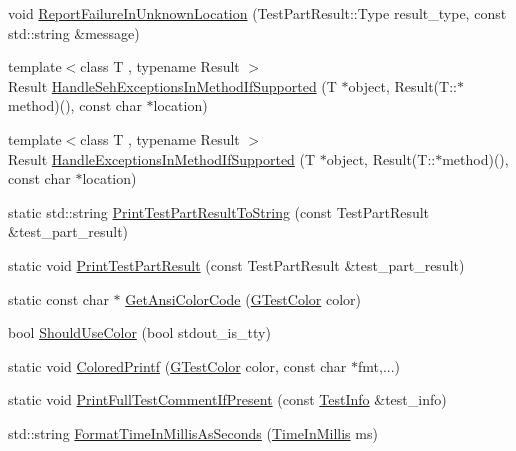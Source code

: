 \begin{DoxyCompactItemize}
\item 
void \mbox{\hyperlink{namespacetesting_1_1internal_a85f6ff0e40f9a5f10af66a73cf1364fa}{Report\+Failure\+In\+Unknown\+Location}} (Test\+Part\+Result\+::\+Type result\+\_\+type, const std\+::string \&message)
\item 
{\footnotesize template$<$class T , typename Result $>$ }\\Result \mbox{\hyperlink{namespacetesting_1_1internal_ac5293b438139ef7ed05cb7fcaaf63545}{Handle\+Seh\+Exceptions\+In\+Method\+If\+Supported}} (T $\ast$object, Result(T\+::$\ast$method)(), const char $\ast$location)
\item 
{\footnotesize template$<$class T , typename Result $>$ }\\Result \mbox{\hyperlink{namespacetesting_1_1internal_addb2ed165b92b74e25fe9ebe9e46b9f9}{Handle\+Exceptions\+In\+Method\+If\+Supported}} (T $\ast$object, Result(T\+::$\ast$method)(), const char $\ast$location)
\item 
static std\+::string \mbox{\hyperlink{namespacetesting_1_1internal_ada13cbf91139f0809a5a31ea2594c1ad}{Print\+Test\+Part\+Result\+To\+String}} (const Test\+Part\+Result \&test\+\_\+part\+\_\+result)
\item 
static void \mbox{\hyperlink{namespacetesting_1_1internal_ac844b3d05dd6f665f72e2a1cec1872ba}{Print\+Test\+Part\+Result}} (const Test\+Part\+Result \&test\+\_\+part\+\_\+result)
\item 
static const char $\ast$ \mbox{\hyperlink{namespacetesting_1_1internal_a27e2b771bd01c527d3e9c232a346315f}{Get\+Ansi\+Color\+Code}} (\mbox{\hyperlink{namespacetesting_1_1internal_a648c1bc94c2ef9e868ff3f9dff0f9c4e}{G\+Test\+Color}} color)
\item 
bool \mbox{\hyperlink{namespacetesting_1_1internal_ac1db1b4603967a6c4404f31cbbac31a6}{Should\+Use\+Color}} (bool stdout\+\_\+is\+\_\+tty)
\item 
static void \mbox{\hyperlink{namespacetesting_1_1internal_a1d9493ff218e622051c53094eb54bcd6}{Colored\+Printf}} (\mbox{\hyperlink{namespacetesting_1_1internal_a648c1bc94c2ef9e868ff3f9dff0f9c4e}{G\+Test\+Color}} color, const char $\ast$fmt,...)
\item 
static void \mbox{\hyperlink{namespacetesting_1_1internal_a55f54e26c86c7e5cb9de04b4eccd21b8}{Print\+Full\+Test\+Comment\+If\+Present}} (const \mbox{\hyperlink{classtesting_1_1TestInfo}{Test\+Info}} \&test\+\_\+info)
\item 
std\+::string \mbox{\hyperlink{namespacetesting_1_1internal_a904485f27a54be8a5a92856e2d838797}{Format\+Time\+In\+Millis\+As\+Seconds}} (\mbox{\hyperlink{namespacetesting_1_1internal_a66a845df404b38fe85c5e14a069f255a}{Time\+In\+Millis}} ms)

\end{DoxyCompactItemize}
